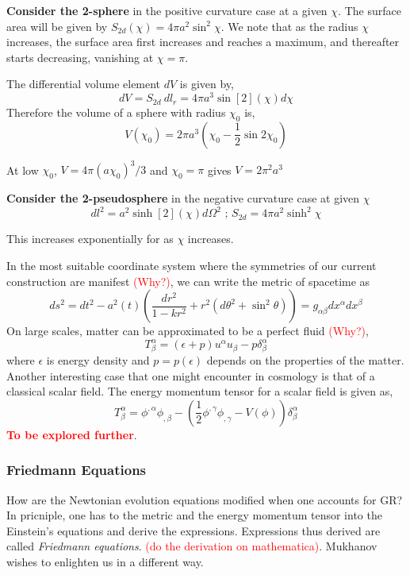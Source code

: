 \documentclass[a4paper,11pt]{article}
\begin{document}
\textbf{Consider the 2-sphere} in the positive curvature case at a given $\chi$. The surface area will be given by $S_{2d}(\chi) = 4 \pi a^2 \sin^2 \chi$. We note that as the radius $\chi$ increases, the surface area first increases and reaches a maximum, and thereafter starts decreasing, vanishing at $\chi=\pi$.

The differential volume element $dV$ is given by,
$$dV = S_{2d} \ dl_r = 4 \pi a^3 \sin[2](\chi) d \chi$$ Therefore the volume of a sphere with radius $\chi_0$ is,
$$V(\chi_0) = 2 \pi a^3 (\chi_0 - \frac{1}{2} \sin 2\chi_0)$$

At low $\chi_0$, $V = 4 \pi (a \chi_0)^3/3$ and $\chi_0=\pi$ gives $V = 2 \pi^2 a^3$

\textbf{Consider the 2-pseudosphere} in the negative curvature case at 	given $\chi$
$$dl^2 = a^2 \sinh[2](\chi)d \Omega^2 \text{ ; } S_{2d} =4 \pi a^2 \sinh^2 \chi $$

This increases exponentially for as $\chi$ increases.

In the most suitable coordinate system where the symmetries of our current construction are manifest \textcolor{red}{(Why?)}, we can write the metric of spacetime as 
$$ds^2 = dt^2 - a^2(t) \left(\frac{dr^2}{1 - k{r^2}} + r^2(d\theta^2 + \sin^2\theta)\right) = g_{\alpha \beta} dx^\alpha dx^\beta$$ On large scales, matter can be approximated to be a perfect fluid \textcolor{red}{(Why?)},
$$T^\alpha_\beta = (\epsilon+p)u^\alpha u_\beta - p \delta^\alpha_\beta$$
where $\epsilon$ is energy density and $p= p (\epsilon)$ depends on the properties of the matter. Another interesting case that one might encounter in cosmology is that of a classical scalar field. The energy momentum tensor for a scalar field is given as,
$$T^\alpha_\beta = \phi^{,\alpha} \phi_{,\beta} - \left( \frac{1}{2}\phi^{,\gamma} \phi_{,\gamma} - V(\phi) \right)\delta^\alpha_\beta$$
\textbf{\textcolor{red}{To be explored further}}.

\subsubsection*{Friedmann Equations}

How are the Newtonian evolution equations modified when one accounts for GR? In pricniple, one has to the metric and the energy momentum tensor into the Einstein's equations and derive the expressions. Expressions thus derived are called \textit{Friedmann equations}. \textcolor{red}{(do the derivation on mathematica)}. Mukhanov wishes to enlighten us in a different way.
\end{document}
